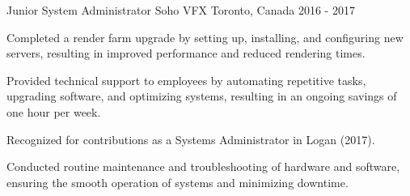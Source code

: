 \begin{cventries}
\cventry
  {Junior System Administrator}
  {Soho VFX}
  {Toronto, Canada}
  {2016 - 2017}
  {
    \begin{cvitems}
      \item Completed a render farm upgrade by setting up, installing, and configuring new servers, resulting in improved performance and reduced rendering times.
      \item Provided technical support to employees by automating repetitive tasks, upgrading software, and optimizing systems, resulting in an ongoing savings of one hour per week.
      \item Recognized for contributions as a Systems Administrator in Logan (2017).
      \item Conducted routine maintenance and troubleshooting of hardware and software, ensuring the smooth operation of systems and minimizing downtime.
    \end{cvitems}
  }

\end{cventries}
